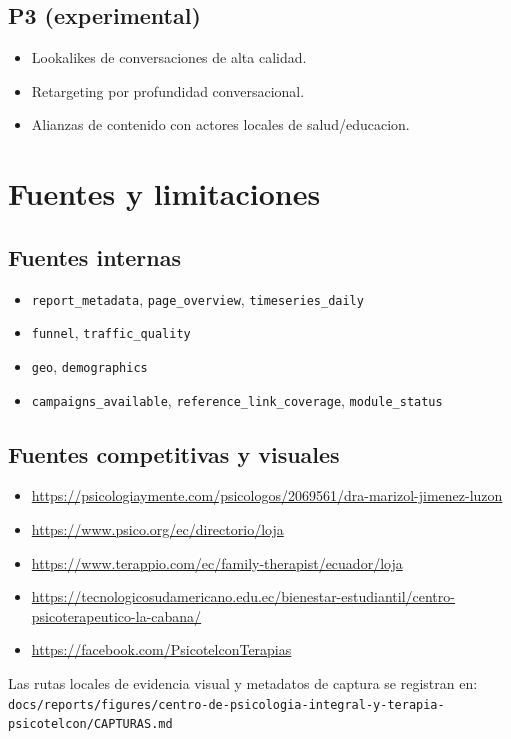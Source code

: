 \documentclass[9pt,a4paper,twocolumn,twoside]{tau-class/tau}
\begin{document}
\subsection{P3 (experimental)}
\begin{itemize}
  \item Lookalikes de conversaciones de alta calidad.
  \item Retargeting por profundidad conversacional.
  \item Alianzas de contenido con actores locales de salud/educacion.
\end{itemize}

\section{Fuentes y limitaciones}

\subsection{Fuentes internas}
\begin{itemize}
  \item \texttt{report\_metadata}, \texttt{page\_overview}, \texttt{timeseries\_daily}
  \item \texttt{funnel}, \texttt{traffic\_quality}
  \item \texttt{geo}, \texttt{demographics}
  \item \texttt{campaigns\_available}, \texttt{reference\_link\_coverage}, \texttt{module\_status}
\end{itemize}

\subsection{Fuentes competitivas y visuales}
\begin{itemize}
  \item \url{https://psicologiaymente.com/psicologos/2069561/dra-marizol-jimenez-luzon}
  \item \url{https://www.psico.org/ec/directorio/loja}
  \item \url{https://www.terappio.com/ec/family-therapist/ecuador/loja}
  \item \url{https://tecnologicosudamericano.edu.ec/bienestar-estudiantil/centro-psicoterapeutico-la-cabana/}
  \item \url{https://facebook.com/PsicotelconTerapias}
\end{itemize}

Las rutas locales de evidencia visual y metadatos de captura se registran en:
\texttt{docs/reports/figures/centro-de-psicologia-integral-y-terapia-psicotelcon/CAPTURAS.md}
\end{document}
